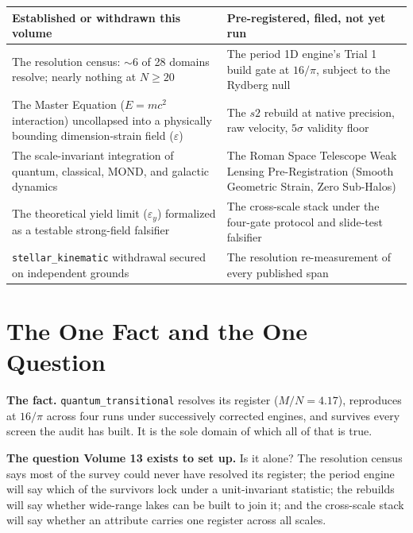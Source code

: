\documentclass[11pt, letterpaper, openany]{book}
\newcommand{\MN}{M/N}
\begin{document}
\begin{table}[H]
\centering
\small
\begin{tabular}{@{}p{}p{}@{}}
\toprule
\textbf{Established or withdrawn this volume} & \textbf{Pre-registered, filed, not yet run} \\
\midrule
The resolution census: $\sim$6 of 28 domains resolve; nearly nothing at $N \geq 20$ & The period
1D engine's Trial 1 build gate at $16/\pi$, subject to the Rydberg null \\
\addlinespace
The Master Equation ($E=mc^2$ interaction) uncollapsed into a physically bounding dimension-strain field ($\varepsilon$) & The $s2$ rebuild
at native precision, raw velocity, $5\sigma$ validity floor \\
\addlinespace
The scale-invariant integration of quantum, classical, MOND, and galactic dynamics & The Roman Space Telescope Weak Lensing Pre-Registration (Smooth Geometric Strain, Zero Sub-Halos) \\
\addlinespace
The theoretical yield limit ($\varepsilon_y$) formalized as a testable strong-field falsifier & The cross-scale stack under the
four-gate protocol and slide-test falsifier \\
\addlinespace
\texttt{stellar\_kinematic} withdrawal secured on independent grounds & The resolution
re-measurement of every published span \\
\bottomrule
\end{tabular}
\end{table}

\section{The One Fact and the One Question}

\begin{signalbox}
\textbf{The fact.} \texttt{quantum\_transitional} resolves its register ($\MN = 4.17$), reproduces
at $16/\pi$ across four runs under successively corrected engines, and survives every screen the
audit has built. It is the sole domain of which all of that is true.

\medskip
\textbf{The question Volume 13 exists to set up.} Is it alone? The resolution census says most of
the survey could never have resolved its register; the period engine will say which of the survivors
lock under a unit-invariant statistic; the rebuilds will say whether wide-range lakes can be built to
join it; and the cross-scale stack will say whether an attribute carries one register across all scales.
\end{signalbox}
\end{document}
